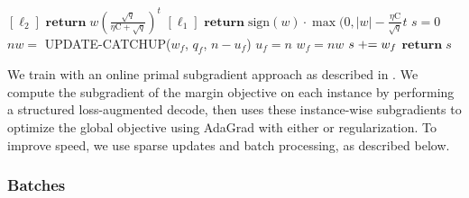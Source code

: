 \begin{algorithm}
\begin{algorithmic}[1]
                   
          \State $[\ell_2]$ $\mathbf{return} \; w \left(\frac{\sqrt{q}}{\eta \mathrm{C} + \sqrt{q}}\right)^t$ 
          \State $[\ell_1]$ $\mathbf{return} \; \mathrm{sign}(w) \cdot \max(0, |w| - \frac{\eta \mathrm{C}}{\sqrt{q}} t$
    \EndFunction
     
        \State $s = 0$                   
             
          \State $nw =$ \label{alg:line:parallel:start} {\footnotesize UPDATE-CATCHUP}($w_f$, $q_f$, $n - u_f$)
           
            \State $u_f = n$ 
            \State $w_f = nw$ \label{alg:line:parallel:end} 
          \EndIf
          \State $s \mathrel{+}= w_f$
        \EndFor
        \State $\mathbf{return} \; s$
    \EndFunction
\end{algorithmic}
\end{algorithm}

We train with an online primal subgradient approach \parencite{Ratliff:2007} as described in \textcite{Kummerfeld-etal:2015:EMNLP}.
We compute the subgradient of the margin objective on each instance by performing a structured loss-augmented decode, then uses these instance-wise subgradients to optimize the global objective using AdaGrad \parencite{Duchi:2011} with either \Lone or \Ltwo regularization.
To improve speed, we use sparse updates and batch processing, as described below.

\subsubsection{Batches}

